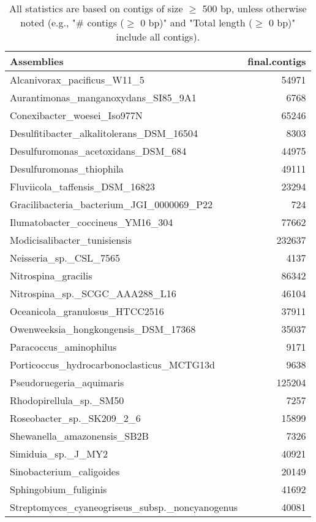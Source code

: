 \documentclass[12pt,a4paper]{article}
\begin{document}
\begin{table}[ht]
\begin{center}
\caption{All statistics are based on contigs of size $\geq$ 500 bp, unless otherwise noted (e.g., "\# contigs ($\geq$ 0 bp)" and "Total length ($\geq$ 0 bp)" include all contigs).}
\begin{tabular}{|l*{1}{|r}|}
\hline
Assemblies & final.contigs \\ \hline
Alcanivorax\_pacificus\_W11\_5 & 54971 \\ \hline
Aurantimonas\_manganoxydans\_SI85\_9A1 & 6768 \\ \hline
Conexibacter\_woesei\_Iso977N & 65246 \\ \hline
Desulfitibacter\_alkalitolerans\_DSM\_16504 & 8303 \\ \hline
Desulfuromonas\_acetoxidans\_DSM\_684 & 44975 \\ \hline
Desulfuromonas\_thiophila & 49111 \\ \hline
Fluviicola\_taffensis\_DSM\_16823 & 23294 \\ \hline
Gracilibacteria\_bacterium\_JGI\_0000069\_P22 & 724 \\ \hline
Ilumatobacter\_coccineus\_YM16\_304 & 77662 \\ \hline
Modicisalibacter\_tunisiensis & 232637 \\ \hline
Neisseria\_sp.\_CSL\_7565 & 4137 \\ \hline
Nitrospina\_gracilis & 86342 \\ \hline
Nitrospina\_sp.\_SCGC\_AAA288\_L16 & 46104 \\ \hline
Oceanicola\_granulosus\_HTCC2516 & 37911 \\ \hline
Owenweeksia\_hongkongensis\_DSM\_17368 & 35037 \\ \hline
Paracoccus\_aminophilus & 9171 \\ \hline
Porticoccus\_hydrocarbonoclasticus\_MCTG13d & 9638 \\ \hline
Pseudoruegeria\_aquimaris & 125204 \\ \hline
Rhodopirellula\_sp.\_SM50 & 7257 \\ \hline
Roseobacter\_sp.\_SK209\_2\_6 & 15899 \\ \hline
Shewanella\_amazonensis\_SB2B & 7326 \\ \hline
Simiduia\_sp.\_J\_MY2 & 40921 \\ \hline
Sinobacterium\_caligoides & 20149 \\ \hline
Sphingobium\_fuliginis & 41692 \\ \hline
Streptomyces\_cyaneogriseus\_subsp.\_noncyanogenus & 40081 \\ \hline

\end{tabular}
\end{center}
\end{table}
\end{document}
